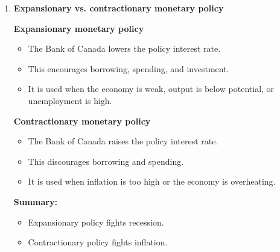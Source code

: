 \documentclass[12pt]{article}
\begin{document}
\begin{enumerate}[label=\textbf{\arabic*.}, start=7]
\textbf{Step 6: Aggregate demand changes}\\
Changes in consumption, investment, and net exports shift aggregate demand.

\textbf{Step 7: Output and inflation respond}\\
Higher AD raises output in the short run and may increase inflationary pressure. Lower AD reduces inflationary pressure.

\textbf{Conclusion:} Monetary policy affects the economy indirectly through interest rates, exchange rates, and spending decisions.

\item \textbf{Expansionary vs. contractionary monetary policy}

\textbf{Expansionary monetary policy}
\begin{itemize}
    \item The Bank of Canada lowers the policy interest rate.
    \item This encourages borrowing, spending, and investment.
    \item It is used when the economy is weak, output is below potential, or unemployment is high.
\end{itemize}

\textbf{Contractionary monetary policy}
\begin{itemize}
    \item The Bank of Canada raises the policy interest rate.
    \item This discourages borrowing and spending.
    \item It is used when inflation is too high or the economy is overheating.
\end{itemize}

\textbf{Summary:}
\begin{itemize}
    \item Expansionary policy fights recession.
    \item Contractionary policy fights inflation.
\end{itemize}

\end{enumerate}
\end{document}
